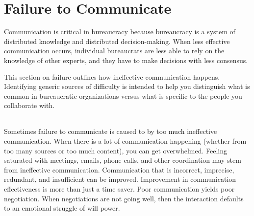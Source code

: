 \section{Failure to Communicate\label{sec:failure-to-comm}}

Communication is critical in bureaucracy because bureaucracy is a system of distributed knowledge and distributed decision-making. When less effective communication occurs, individual bureaucrats are less able to rely on the knowledge of other experts, and they have to make decisions with less consensus. 

This section on failure outlines how ineffective communication happens. Identifying generic sources of difficulty is intended to help you distinguish what is common in bureaucratic organizations versus what is specific to the people you collaborate with. 


\ \\

Sometimes failure to communicate is caused to by too much ineffective communication. 
When there is a lot of communication happening (whether from too many sources or too much content), you can get overwhelmed.
Feeling saturated with meetings, emails, phone calls, and other coordination may stem from ineffective communication. 
Communication that is incorrect, imprecise, redundant, and insufficient can be improved. 
Improvement in communication effectiveness is more than just a time saver.
Poor communication yields poor negotiation. When negotiations are not going well, then the interaction defaults to an emotional struggle of will power. 


